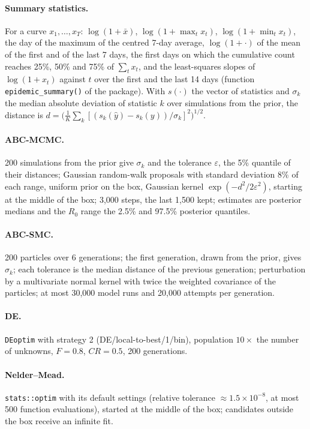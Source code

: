 \documentclass[12pt]{article}
\begin{document}
\paragraph{Summary statistics.} For a curve $x_1,\dots,x_T$: $\log(1+\bar x)$, $\log(1+\max_t x_t)$,
$\log(1+\min_t x_t)$, the day of the maximum of the centred 7-day average, $\log(1+\cdot)$ of the mean of
the first and of the last 7 days, the first days on which the cumulative count reaches 25\%, 50\% and 75\%
of $\sum_t x_t$, and the least-squares slopes of $\log(1+x_t)$ against $t$ over the first and the last 14
days (function \texttt{epidemic\_summary()} of the package). With $s(\cdot)$ the vector of statistics and
$\sigma_k$ the median absolute deviation of statistic $k$ over simulations from the prior, the distance is
$d = \big(\frac1K\sum_k [(s_k(\hat y)-s_k(y))/\sigma_k]^2\big)^{1/2}$.

\paragraph{ABC-MCMC.} 200 simulations from the prior give $\sigma_k$ and the tolerance $\varepsilon$, the 5\%
quantile of their distances; Gaussian random-walk proposals with standard deviation 8\% of each range,
uniform prior on the box, Gaussian kernel $\exp(-d^2/2\varepsilon^2)$, starting at the middle of the box;
3,000 steps, the last 1,500 kept; estimates are posterior medians and the $R_0$ range the 2.5\% and 97.5\%
posterior quantiles.

\paragraph{ABC-SMC.} 200 particles over 6 generations; the first generation, drawn from the prior, gives
$\sigma_k$; each tolerance is the median distance of the previous generation; perturbation by a
multivariate normal kernel with twice the weighted covariance of the particles; at most 30,000 model runs
and 20,000 attempts per generation.

\paragraph{DE.} \texttt{DEoptim} with strategy 2 (DE/local-to-best/1/bin), population $10 \times$ the number
of unknowns, $F = 0.8$, $CR = 0.5$, 200 generations.

\paragraph{Nelder--Mead.} \texttt{stats::optim} with its default settings (relative tolerance
$\approx 1.5\times10^{-8}$, at most 500 function evaluations), started at the middle of the box; candidates
outside the box receive an infinite fit.
\end{document}
